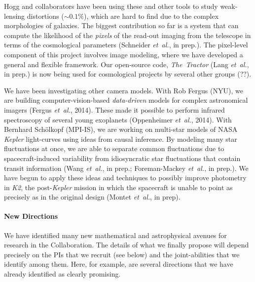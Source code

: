 \documentclass[12pt]{article}
\newcommand{\foreign}[1]{\textsl{#1}}
\newcommand{\etal}{\foreign{et~al.}}
\newcommand{\project}[1]{\textsl{#1}}
\begin{document}
Hogg and collaborators have been using these and other tools to study
weak-lensing distortions ($\sim 0.1\%$), which are hard to find
due to the complex morphologies of galaxies.
The biggest contribution so far is a system
that can compute the likelihood of the \emph{pixels} of the read-out
imaging from the telescope in terms of the cosmological parameters
(Schneider \etal, in prep.).
The pixel-level component of this project involves image modeling,
where we have developed a general and flexible framework.
Our open-source code, \project{The~Tractor} (Lang \etal,
in prep.) is now being used for cosmological projects by several other groups (??).

We have been investigating other camera models.
With Rob Fergus (NYU), we are building
computer-vision-based \emph{data-driven} models for complex astronomical 
imagers (Fergus \etal, 2014).
These made it possible to perform infrared spectroscopy of several 
young exoplanets (Oppenheimer \etal, 2014).
With Bernhard Sch\"olkopf (MPI-IS), we are working on multi-star models
of NASA \project{Kepler} light-curves using ideas from
causal inference. 
By modeling many star fluctuations at once, we are able to separate
common fluctuations due to spacecraft-induced variability from idiosyncratic
star fluctuations that contain transit information (Wang \etal, in prep.;
Foreman-Mackey \etal, in prep.).
We have begun to apply these ideas and techniques to 
possibly improve photometry in \project{K2}, the
post-\project{Kepler} mission in which the spacecraft is unable to point
as precisely as in the original design (Montet \etal, in prep).

\paragraph{New Directions}

We have identified many new mathematical and astrophysical avenues for
research in the Collaboration.
The details of what we finally propose will depend precisely on the
PIs that we recruit (see below) and the joint-abilities that we
identify among them.
Here, for example, are several directions that we have already
identified as clearly promising.

\end{document}
